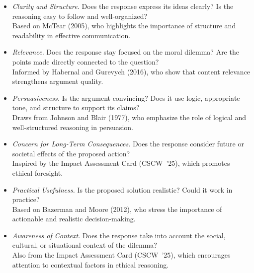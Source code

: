 \begin{itemize}
  \item \textit{Clarity and Structure.} Does the response express its ideas clearly? Is the reasoning easy to follow and well-organized?\\
    \hspace*{0.5em}Based on McTear (2005), who highlights the importance of structure and readability in effective communication.

  \item \textit{Relevance.} Does the response stay focused on the moral dilemma? Are the points made directly connected to the question?\\
    \hspace*{0.5em}Informed by Habernal and Gurevych (2016), who show that content relevance strengthens argument quality.

  \item \textit{Persuasiveness.} Is the argument convincing? Does it use logic, appropriate tone, and structure to support its claims?\\
    \hspace*{0.5em}Draws from Johnson and Blair (1977), who emphasize the role of logical and well-structured reasoning in persuasion.

  \item \textit{Concern for Long-Term Consequences.} Does the response consider future or societal effects of the proposed action?\\
    \hspace*{0.5em}Inspired by the Impact Assessment Card (CSCW~'25), which promotes ethical foresight.

  \item \textit{Practical Usefulness.} Is the proposed solution realistic? Could it work in practice?\\
    \hspace*{0.5em}Based on Bazerman and Moore (2012), who stress the importance of actionable and realistic decision-making.

  \item \textit{Awareness of Context.} Does the response take into account the social, cultural, or situational context of the dilemma?\\
    \hspace*{0.5em}Also from the Impact Assessment Card (CSCW~'25), which encourages attention to contextual factors in ethical reasoning.
\end{itemize}

